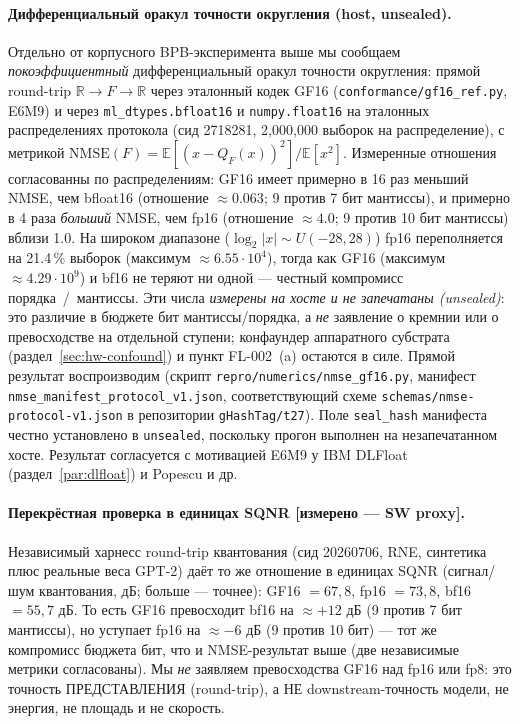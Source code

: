 \documentclass[11pt,a4paper]{article}
\theoremstyle{plain}
\begin{document}
\paragraph{Дифференциальный оракул точности округления (host, unsealed).}
\label{par:nmse-oracle}
Отдельно от корпусного BPB-эксперимента выше мы сообщаем
\emph{покоэффициентный} дифференциальный оракул точности округления: прямой
round-trip \(\mathbb{R} \to F \to \mathbb{R}\) через эталонный кодек GF16
(\texttt{conformance/gf16\_ref.py}, E6M9) и через \texttt{ml\_dtypes.bfloat16} и
\texttt{numpy.float16} на эталонных распределениях протокола (сид 2718281,
2{,}000{,}000 выборок на распределение), с метрикой
\(\mathrm{NMSE}(F) = \mathbb{E}[(x - Q_F(x))^2] / \mathbb{E}[x^2]\). Измеренные
отношения согласованны по распределениям: GF16 имеет примерно в 16 раз
меньший NMSE, чем bfloat16 (отношение \(\approx 0.063\); 9 против 7 бит
мантиссы), и примерно в 4 раза \emph{больший} NMSE, чем fp16 (отношение
\(\approx 4.0\); 9 против 10 бит мантиссы) вблизи 1.0. На широком
диапазоне (\(\log_2|x| \sim U(-28, 28)\)) fp16 переполняется на 21.4\,\%
выборок (максимум \(\approx 6.55\cdot10^{4}\)), тогда как GF16 (максимум
\(\approx 4.29\cdot10^{9}\)) и bf16 не теряют ни одной --- честный
компромисс порядка~/~мантиссы. Эти числа \emph{измерены на хосте и не
запечатаны (unsealed)}: это различие в бюджете бит мантиссы/порядка,
а \emph{не} заявление о кремнии или о превосходстве на отдельной ступени;
конфаундер аппаратного субстрата (раздел~\ref{sec:hw-confound}) и пункт
FL-002~(a) остаются в силе. Прямой результат воспроизводим (скрипт
\texttt{repro/numerics/nmse\_gf16.py}, манифест
\texttt{nmse\_manifest\_protocol\_v1.json}, соответствующий схеме
\texttt{schemas/nmse-protocol-v1.json} в репозитории \texttt{gHashTag/t27}). Поле
\texttt{seal\_hash} манифеста честно установлено в \texttt{unsealed},
поскольку прогон выполнен на незапечатанном хосте. Результат согласуется
с мотивацией E6M9 у IBM DLFloat (раздел~\ref{par:dlfloat}) и Popescu и др.

\paragraph{Перекрёстная проверка в единицах SQNR [измерено --- SW proxy].}
Независимый харнесс round-trip квантования (сид 20260706, RNE, синтетика
плюс реальные веса GPT-2) даёт то же отношение в единицах SQNR
(сигнал/шум квантования, дБ; больше --- точнее): GF16 \(= 67{,}8\),
fp16 \(= 73{,}8\), bf16 \(= 55{,}7\) дБ. То есть GF16 превосходит bf16 на
\(\approx +12\) дБ (9 против 7 бит мантиссы), но уступает fp16 на
\(\approx -6\) дБ (9 против 10 бит) --- тот же компромисс бюджета бит,
что и NMSE-результат выше (две независимые метрики согласованы).
Мы \emph{не} заявляем превосходства GF16 над fp16 или fp8: это точность
ПРЕДСТАВЛЕНИЯ (round-trip), а НЕ downstream-точность модели, не
энергия, не площадь и не скорость.
\end{document}
